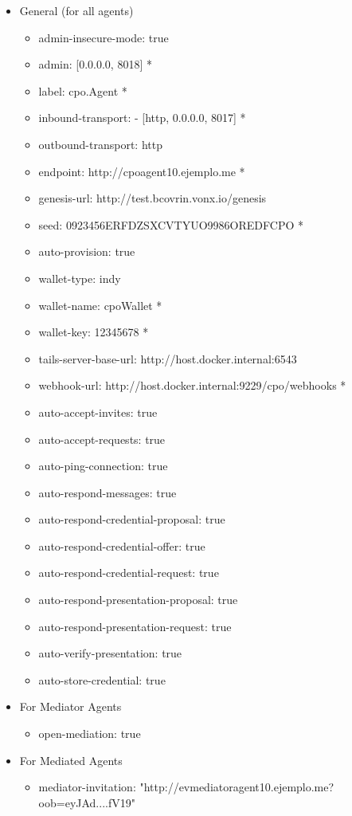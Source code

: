 \iffalse

\begin{itemize}
    \item General (for all agents)
    \begin{itemize}
        \item admin-insecure-mode: true
        \item admin: [0.0.0.0, 8018] *
        \item label: cpo.Agent *
        \item inbound-transport: - [http, 0.0.0.0, 8017] *
        \item outbound-transport: http
        \item endpoint: http://cpoagent10.ejemplo.me *
        \item genesis-url: http://test.bcovrin.vonx.io/genesis 
        \item seed: 0923456ERFDZSXCVTYUO9986OREDFCPO *
        \item auto-provision: true
        \item wallet-type: indy
        \item wallet-name: cpoWallet *
        \item wallet-key: 12345678 *
        \item tails-server-base-url: http://host.docker.internal:6543
        \item webhook-url: http://host.docker.internal:9229/cpo/webhooks *
        \item auto-accept-invites: true
        \item auto-accept-requests: true
        \item auto-ping-connection: true
        \item auto-respond-messages: true
        \item auto-respond-credential-proposal: true
        \item auto-respond-credential-offer: true
        \item auto-respond-credential-request: true
        \item auto-respond-presentation-proposal: true
        \item auto-respond-presentation-request: true
        \item auto-verify-presentation: true
        \item auto-store-credential: true
    \end{itemize}
    \item For Mediator Agents
    \begin{itemize}
        \item open-mediation: true
    \end{itemize}
    \item For Mediated Agents
    \begin{itemize}
        \item mediator-invitation: "http://evmediatoragent10.ejemplo.me?oob=eyJAd....fV19"
    \end{itemize}
\end{itemize}

